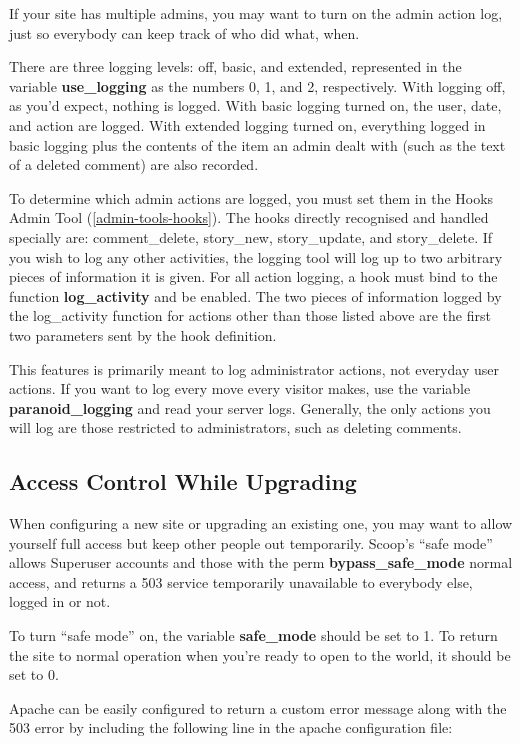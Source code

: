 If your site has multiple admins, you may want to turn on the admin action log, just so everybody can keep track of who did what, when.

There are three logging levels: off, basic, and extended, represented in the variable {\bf use\_logging} as the numbers 0, 1, and 2, respectively.  With logging off, as you'd expect, nothing is logged.  With basic logging turned on, the user, date, and action are logged.  With extended logging turned on, everything logged in basic logging plus the contents of the item an admin dealt with (such as the text of a deleted comment) are also recorded.

To determine which admin actions are logged, you must set them in the Hooks Admin Tool (\ref{admin-tools-hooks}).  The hooks directly recognised and handled specially are: comment\_delete, story\_new, story\_update, and story\_delete.  If you wish to log any other activities, the logging tool will log up to two arbitrary pieces of information it is given.  For all action logging, a hook must bind to the function {\bf log\_activity} and be enabled.  The two pieces of information logged by the log\_activity function for actions other than those listed above are the first two parameters sent by the hook definition.

This features is primarily meant to log administrator actions, not everyday user actions.  If you want to log every move every visitor makes, use the variable {\bf paranoid\_logging} and read your server logs.  Generally, the only actions you will log are those restricted to administrators, such as deleting comments.

\subsection{Access Control While Upgrading}
\label{features-safemode}

When configuring a new site or upgrading an existing one, you may want to allow yourself full access but keep other people out temporarily. Scoop's ``safe mode'' allows Superuser accounts and those with the perm {\bf bypass\_safe\_mode} normal access, and returns a 503 service temporarily unavailable to everybody else, logged in or not. 

To turn ``safe mode'' on, the variable {\bf safe\_mode} should be set to 1. To return the site to normal operation when you're ready to open to the world, it should be set to 0.

Apache can be easily configured to return a custom error message along with the 503 error by including the following line in the apache configuration file:

